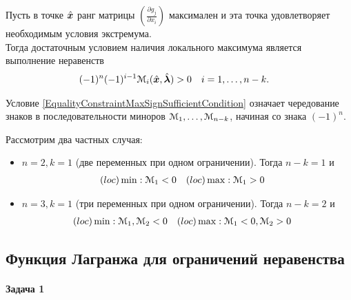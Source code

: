 \begin{teorema}\label{EqualityConstraintMaxSufficientCondition}
Пусть в точке $\hat{{\bm x}}$  ранг матрицы $(\frac{\partial g_j}{\partial x_i})$ максимален и 
эта точка удовлетворяет необходимым условия экстремума.\\
Тогда достаточным условием наличия локального максимума является выполнение неравенств
\begin{align}\label{EqualityConstraintMaxSignSufficientCondition}
	(-1)^n(-1)^{i-1}{\mathcal M}_i(\hat{{\bm x}},\hat{{\bm{ \lambda}}})&>0 & 
	i&=1,\ldots,n-k.
\end{align}
\end{teorema}
\begin{remark}
Условие \eqref{EqualityConstraintMaxSignSufficientCondition} означает чередование знаков
в последовательности миноров ${\mathcal M}_1,\ldots,{\mathcal M}_{n-k}$, начиная со знака $(-1)^n$.
\end{remark}
Рассмотрим два частных случая:
\begin{itemize}
	\item \(n=2,k=1\) (две переменных при одном ограничении). Тогда 
	\(n-k=1\) и 
	\begin{align*}
		(loc)\min:&\; {\mathcal M}_1<0 & (loc)\max:&\; {\mathcal M}_1>0
	\end{align*}
	\item \(n=3,k=1\) (три переменных при одном ограничении). Тогда 
	\(n-k=2\) и 
	\begin{align*}
		(loc)\min:&\; {\mathcal M}_1,{\mathcal M}_2<0 & 
		(loc)\max:&\; {\mathcal M}_1<0,{\mathcal M}_2>0
	\end{align*}
\end{itemize}
	
\subsection{Функция Лагранжа для ограничений неравенства}

\paragraph{Задача 1}

